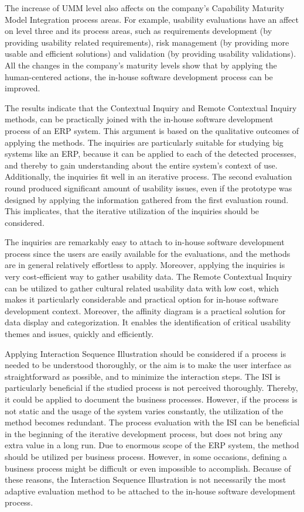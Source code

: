 \documentclass[12pt,a4paper,oneside,pdftex]{report}
\begin{document}
The increase of UMM level also affects on the company's Capability Maturity Model Integration process areas. For example, usability evaluations have an affect on level three and its process areas, such as requirements development (by providing usability related requirements), risk management (by providing more usable and efficient solutions) and validation (by providing usability validations). All the changes in the company's maturity levels show that by applying the human-centered actions, the in-house software development process can be improved.

The results indicate that the Contextual Inquiry and Remote Contextual Inquiry methods, can be practically joined with the in-house software development process of an ERP system. This argument is based on the qualitative outcomes of applying the methods. The inquiries are particularly suitable for studying big systems like an ERP, because it can be applied to each of the detected processes, and thereby to gain understanding about the entire system's context of use. Additionally, the inquiries fit well in an iterative process. The second evaluation round produced significant amount of usability issues, even if the prototype was designed by applying the information gathered from the first evaluation round. This implicates, that the iterative utilization of the inquiries should be considered. 

The inquiries are remarkably easy to attach to in-house software development process since the users are easily available for the evaluations, and the methods are in general relatively effortless to apply. Moreover, applying the inquiries is very cost-efficient way to gather usability data. The Remote Contextual Inquiry can be utilized to gather cultural related usability data with low cost, which makes it particularly considerable and practical option for in-house software development context. Moreover, the affinity diagram is a practical solution for data display and categorization. It enables the identification of critical usability themes and issues, quickly and efficiently.   

Applying Interaction Sequence Illustration should be considered if a process is needed to be understood thoroughly, or the aim is to make the user interface as straightforward as possible, and to minimize the interaction steps. The ISI is particularly beneficial if the studied process is not perceived thoroughly. Thereby, it could be applied to document the business processes. However, if the process is not static and the usage of the system varies constantly, the utilization of the method becomes redundant. The process evaluation with the ISI can be beneficial in the beginning of the iterative development process, but does not bring any extra value in a long run. Due to enormous scope of the ERP system, the method should be utilized per business process. However, in some occasions, defining a business process might be difficult or even impossible to accomplish. Because of these reasons, the Interaction Sequence Illustration is not necessarily the most adaptive evaluation method to be attached to the in-house software development process.
\end{document}
